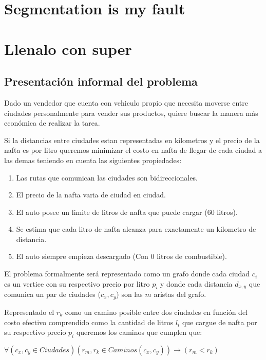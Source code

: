 \documentclass[12pt]{article}
\begin{document}
\section{Segmentation is my fault}




\section{Llenalo con super}

\subsection{Presentación informal del problema}
Dado un vendedor que cuenta con vehiculo propio que necesita moverse entre ciudades personalmente para vender sus productos, quiere buscar la manera más económica de realizar la tarea.

Si la distancias entre ciudades estan representadas en kilometros y el precio de la nafta es por litro queremos minimizar el costo en nafta de llegar de cada ciudad a las demas teniendo en cuenta las siguientes propiedades: 

\begin{enumerate}
	\item Las rutas que comunican las ciudades son bidireccionales.
	\item El precio de la nafta varia de ciudad en ciudad.
	\item El auto posee un limite de litros de nafta que puede cargar (60 litros).
	\item Se estima que cada litro de nafta alcanza para exactamente un kilometro de distancia.
	\item El auto siempre empieza descargado (Con 0 litros de combustible).
\end{enumerate}

El problema formalmente será representado como un grafo donde cada ciudad $c_i$ es un vertice con su respectivo precio por litro $p_i$ y donde cada distancia $d_{x,y}$ que comunica un par de ciudades ($c_x, c_y$) son las $m$ aristas del grafo.

Representado el $r_k$ como un camino posible entre dos ciudades en función del costo efectivo comprendido como la cantidad de litros $l_i$ que cargue de nafta por su respectivo precio $p_i$ queremos los caminos que cumplen que:

$\forall(c_x, c_y \in Ciudades)(r_{m}, r_k \in Caminos(c_x,c_y))\rightarrow(r_{m} < r_k)$
\end{document}
